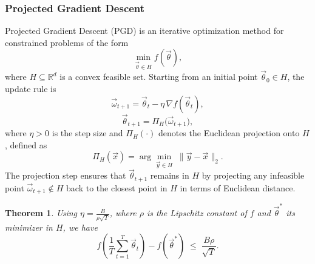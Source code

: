\documentclass[11pt]{article}
\theoremstyle{plain}
\newtheorem{theorem}{Theorem}
\begin{document}
\subsubsection{Projected Gradient Descent}
Projected Gradient Descent (PGD) is an iterative optimization method for constrained problems of the form 
\[
    \min_{\vec{\theta} \in H} f(\vec{\theta}),
\]
where $H \subseteq \mathbb{R}^d$ is a convex feasible set.  
Starting from an initial point $\vec{\theta}_0 \in H$, the update rule is
\[
    \vec{\omega}_{t+1} = \vec{\theta}_t - \eta \, \nabla f(\vec{\theta}_t),
\]
\[
    \vec{\theta}_{t+1} = \Pi_H\big(\vec{\omega}_{t+1}\big),
\]
where $\eta > 0$ is the step size and $\Pi_H(\cdot)$ denotes the Euclidean projection onto $H$, defined as
\[
    \Pi_H(\vec{x}) = \arg\min_{\vec{y} \in H} \; \lVert \vec{y} - \vec{x} \rVert_2.
\]
The projection step ensures that $\vec{\theta}_{t+1}$ remains in $H$ by projecting any infeasible point $\vec{\omega}_{t+1} \notin H$ back to the closest point in $H$ in terms of Euclidean distance.

\begin{theorem}
Using $\eta = \frac{B}{\rho \sqrt{T}}$, where $\rho$ is the Lipschitz constant of $f$ and $\vec{\theta}^*$ its minimizer in $H$, we have
\[
    f\!\left( \frac{1}{T} \sum_{t=1}^T \vec{\theta}_t \right) - f(\vec{\theta}^*) \;\le\; \frac{B\rho}{\sqrt{T}}.
\]
\end{theorem}
\end{document}
